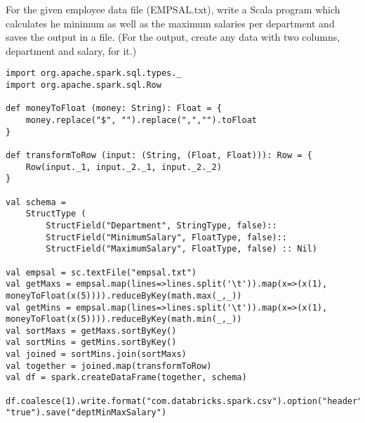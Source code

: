 \documentclass[11pt]{article}
\newcommand{\ques}[1]{\noindent {\bf Question #1: }}
\begin{document}
\newpage
\ques{3} For the given employee data file (EMPSAL.txt), write a Scala program which calculates he minimum as well as the maximum salaries per department and saves the output in a file. (For the output, create any data with two columns, department and salary, for it.)
\begin{lstlisting}
import org.apache.spark.sql.types._
import org.apache.spark.sql.Row

def moneyToFloat (money: String): Float = {
	money.replace("$", "").replace(",","").toFloat
}

def transformToRow (input: (String, (Float, Float))): Row = {
	Row(input._1, input._2._1, input._2._2)
}

val schema = 
	StructType (
		StructField("Department", StringType, false)::
		StructField("MinimumSalary", FloatType, false)::
		StructField("MaximumSalary", FloatType, false) :: Nil)
	
val empsal = sc.textFile("empsal.txt")
val getMaxs = empsal.map(lines=>lines.split('\t')).map(x=>(x(1), moneyToFloat(x(5)))).reduceByKey(math.max(_,_))
val getMins = empsal.map(lines=>lines.split('\t')).map(x=>(x(1), moneyToFloat(x(5)))).reduceByKey(math.min(_,_))
val sortMaxs = getMaxs.sortByKey()
val sortMins = getMins.sortByKey()
val joined = sortMins.join(sortMaxs)
val together = joined.map(transformToRow)
val df = spark.createDataFrame(together, schema)

df.coalesce(1).write.format("com.databricks.spark.csv").option("header", "true").save("deptMinMaxSalary")
\end{lstlisting}
\end{document}

